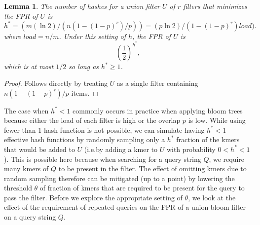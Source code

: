 \documentclass[11pt]{article}
\newtheorem{lem}{Lemma}
\begin{document}
\begin{lem}
The  number of hashes for a union filter $U$ of $r$ filters that minimizes the FPR of $U$ is
\begin{equation}
h^* = (m (\ln 2) / (n(1-(1-p)^r)/p)) = 
(p\ln 2) / (1-(1-p)^r)\textit{load}).
\end{equation}
where $\textit{load} = n / m$.
Under this setting of $h$, the FPR of $U$ is 
\begin{equation}
\left(\frac{1}{2}\right)^{h^*},
\end{equation}
which is at most $1/2$ so long as $h^* \geq 1$.
\end{lem}
\begin{proof}
Follows directly by treating $U$ as a single filter containing $n(1-(1-p)^r)/p$ items.
\end{proof}

The case when $h^* < 1$  commonly occurs in practice when applying bloom trees because either the load of each filter is high or the overlap $p$ is low. While using fewer than 1 hash function is not possible, we can simulate having $h^* < 1$ effective hash functions  by randomly sampling only a $h^*$ fraction of the kmers that would be added to $U$ (i.e.\@ by adding a kmer to $U$ with probability $0 < h^* < 1$). This is possible here because when searching for a query string $Q$, we require many kmers of $Q$ to be present in the filter. The effect of omitting kmers due to random sampling therefore can be mitigated (up to a point) by lowering the  threshold $\theta$ of fraction of kmers that are required to be present  for the query to pass the filter.  Before we explore the appropriate setting of $\theta$, we look at the effect of the requirement of repeated queries on the FPR of a union bloom filter on a query string $Q$.
\end{document}
